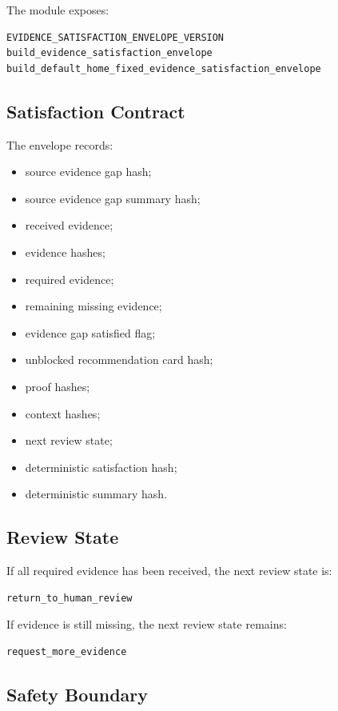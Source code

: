 The module exposes:

\begin{verbatim}
EVIDENCE_SATISFACTION_ENVELOPE_VERSION
build_evidence_satisfaction_envelope
build_default_home_fixed_evidence_satisfaction_envelope
\end{verbatim}

\subsection{Satisfaction Contract}

The envelope records:

\begin{itemize}
  \item source evidence gap hash;
  \item source evidence gap summary hash;
  \item received evidence;
  \item evidence hashes;
  \item required evidence;
  \item remaining missing evidence;
  \item evidence gap satisfied flag;
  \item unblocked recommendation card hash;
  \item proof hashes;
  \item context hashes;
  \item next review state;
  \item deterministic satisfaction hash;
  \item deterministic summary hash.
\end{itemize}

\subsection{Review State}

If all required evidence has been received, the next review state is:

\begin{verbatim}
return_to_human_review
\end{verbatim}

If evidence is still missing, the next review state remains:

\begin{verbatim}
request_more_evidence
\end{verbatim}

\subsection{Safety Boundary}

